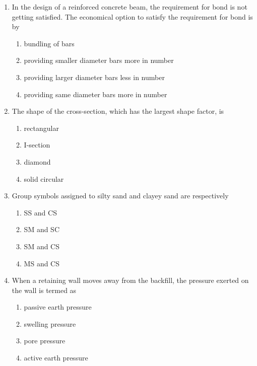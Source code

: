 \documentclass[journal]{IEEEtran}
\begin{document}
\begin{enumerate}
\item In the design of a reinforced concrete beam, the requirement for bond is not getting satisfied. The economical option to satisfy the requirement for bond is by  \textbf{}

\begin{enumerate}
\item bundling of bars 
\item providing smaller diameter bars more in number 
\item  providing larger diameter bars less in number 
\item providing same diameter bars more in number
\end{enumerate}


\item The shape of the cross-section, which has the largest shape factor, is  \textbf{}

\begin{multicols}{2}
\begin{enumerate}
\item rectangular
\item  I-section
\item  diamond
\item solid circular
\end{enumerate}
\end{multicols}




\item  Group symbols assigned to silty sand and clayey sand are respectively  \textbf{}
\begin{multicols}{4}
\begin{enumerate}
\item SS and CS
\item  SM and SC
\item SM and CS
\item MS and CS
\end{enumerate}
\end{multicols}

\item When a retaining wall moves away from the backfill, the pressure exerted on the wall is termed as \textbf{}


\begin{enumerate}
\item passive earth pressure
\item swelling pressure
\item pore pressure
\item active earth pressure
\end{enumerate}



\end{enumerate}
\end{document}
